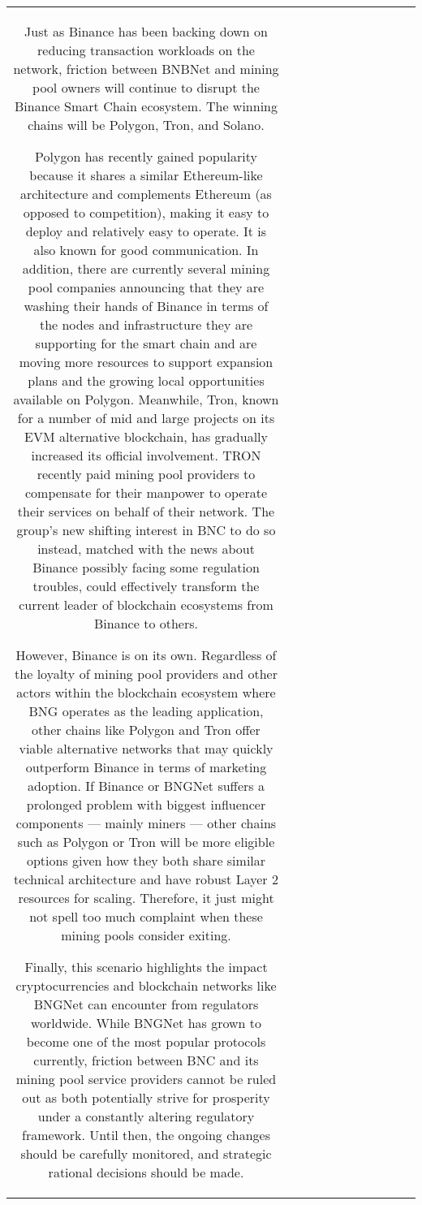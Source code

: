\begin{table}[h!]
\begin{tabular}{|c|c|c|c|c|c|c|c|c|c|c|}
Just as Binance has been backing down on reducing transaction workloads on the network, friction between BNBNet and mining pool owners will continue to disrupt the Binance Smart Chain ecosystem. The winning chains will be Polygon, Tron, and Solano.

Polygon has recently gained popularity because it shares a similar Ethereum-like architecture and complements Ethereum (as opposed to competition), making it easy to deploy and relatively easy to operate. It is also known for good communication. In addition, there are currently several mining pool companies announcing that they are washing their hands of Binance in terms of the nodes and infrastructure they are supporting for the smart chain and are moving more resources to support expansion plans and the growing local opportunities available on Polygon. Meanwhile, Tron, known for a number of mid and large projects on its EVM alternative blockchain, has gradually increased its official involvement. TRON recently paid mining pool providers to compensate for their manpower to operate their services on behalf of their network. The group’s new shifting interest in BNC to do so instead, matched with the news about Binance possibly facing some regulation troubles, could effectively transform the current leader of blockchain ecosystems from Binance to others.

However, Binance is on its own. Regardless of the loyalty of mining pool providers and other actors within the blockchain ecosystem where BNG operates as the leading application, other chains like Polygon and Tron offer viable alternative networks that may quickly outperform Binance in terms of marketing adoption. If Binance or BNGNet suffers a prolonged problem with biggest influencer components — mainly miners — other chains such as Polygon or Tron will be more eligible options given how they both share similar technical architecture and have robust Layer 2 resources for scaling. Therefore, it just might not spell too much complaint when these mining pools consider exiting.

Finally, this scenario highlights the impact cryptocurrencies and blockchain networks like BNGNet can encounter from regulators worldwide. While BNGNet has grown to become one of the most popular protocols currently, friction between BNC and its mining pool service providers cannot be ruled out as both potentially strive for prosperity under a constantly altering regulatory framework. Until then, the ongoing changes should be carefully monitored, and strategic rational decisions should be made.



\end{tabular}
\end{table}
